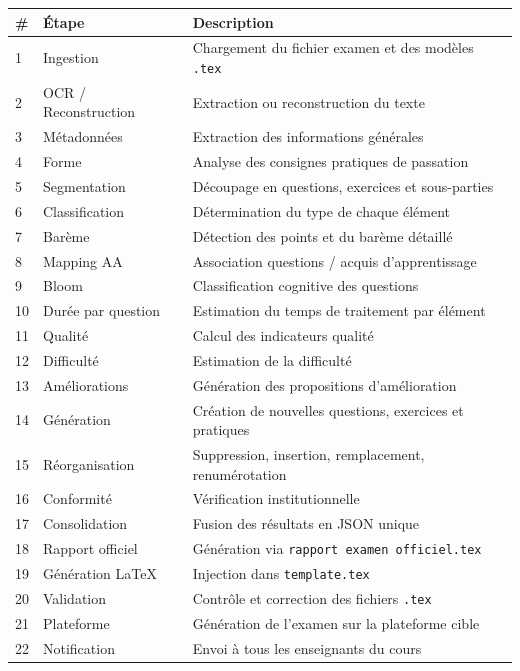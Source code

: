 \documentclass[12pt,a4paper]{article}
\begin{document}
\begin{longtable}{|p{1.2cm}|p{5cm}|p{8cm}|}
\hline
\rowcolor{GrisClair}
\textbf{\#} & \textbf{Étape} & \textbf{Description} \\ \hline
1 & Ingestion & Chargement du fichier examen et des modèles \texttt{.tex} \\ \hline
2 & OCR / Reconstruction & Extraction ou reconstruction du texte \\ \hline
3 & Métadonnées & Extraction des informations générales \\ \hline
4 & Forme & Analyse des consignes pratiques de passation \\ \hline
5 & Segmentation & Découpage en questions, exercices et sous-parties \\ \hline
6 & Classification & Détermination du type de chaque élément \\ \hline
7 & Barème & Détection des points et du barème détaillé \\ \hline
8 & Mapping AA & Association questions / acquis d’apprentissage \\ \hline
9 & Bloom & Classification cognitive des questions \\ \hline
10 & Durée par question & Estimation du temps de traitement par élément \\ \hline
11 & Qualité & Calcul des indicateurs qualité \\ \hline
12 & Difficulté & Estimation de la difficulté \\ \hline
13 & Améliorations & Génération des propositions d’amélioration \\ \hline
14 & Génération & Création de nouvelles questions, exercices et pratiques \\ \hline
15 & Réorganisation & Suppression, insertion, remplacement, renumérotation \\ \hline
16 & Conformité & Vérification institutionnelle \\ \hline
17 & Consolidation & Fusion des résultats en JSON unique \\ \hline
18 & Rapport officiel & Génération via \texttt{rapport examen officiel.tex} \\ \hline
19 & Génération LaTeX & Injection dans \texttt{template.tex} \\ \hline
20 & Validation & Contrôle et correction des fichiers \texttt{.tex} \\ \hline
21 & Plateforme & Génération de l’examen sur la plateforme cible \\ \hline
22 & Notification & Envoi à tous les enseignants du cours \\ \hline
\end{longtable}
\end{document}
